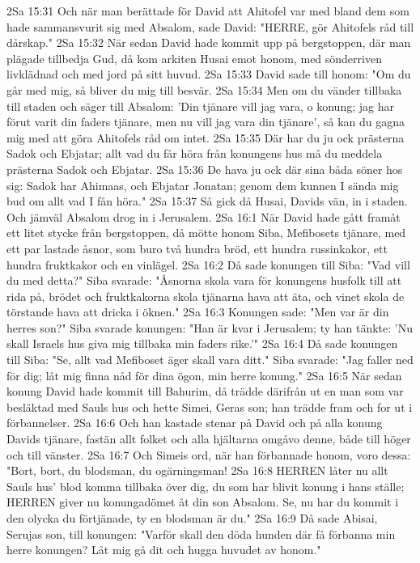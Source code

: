 2Sa 15:31  Och när man berättade för David att Ahitofel var med bland dem som hade sammansvurit sig med Absalom, sade David: "HERRE, gör Ahitofels råd till dårskap."
2Sa 15:32  När sedan David hade kommit upp på bergstoppen, där man plägade tillbedja Gud, då kom arkiten Husai emot honom, med sönderriven livklädnad och med jord på sitt huvud.
2Sa 15:33  David sade till honom: "Om du går med mig, så bliver du mig till besvär.
2Sa 15:34  Men om du vänder tillbaka till staden och säger till Absalom: 'Din tjänare vill jag vara, o konung; jag har förut varit din faders tjänare, men nu vill jag vara din tjänare', så kan du gagna mig med att göra Ahitofels råd om intet.
2Sa 15:35  Där har du ju ock prästerna Sadok och Ebjatar; allt vad du får höra från konungens hus må du meddela prästerna Sadok och Ebjatar.
2Sa 15:36  De hava ju ock där sina båda söner hos sig: Sadok har Ahimaas, och Ebjatar Jonatan; genom dem kunnen I sända mig bud om allt vad I fån höra."
2Sa 15:37  Så gick då Husai, Davids vän, in i staden. Och jämväl Absalom drog in i Jerusalem.
2Sa 16:1  När David hade gått framåt ett litet stycke från bergstoppen, då mötte honom Siba, Mefibosets tjänare, med ett par lastade åsnor, som buro två hundra bröd, ett hundra russinkakor, ett hundra fruktkakor och en vinlägel.
2Sa 16:2  Då sade konungen till Siba: "Vad vill du med detta?" Siba svarade: "Åsnorna skola vara för konungens husfolk till att rida på, brödet och fruktkakorna skola tjänarna hava att äta, och vinet skola de törstande hava att dricka i öknen."
2Sa 16:3  Konungen sade: "Men var är din herres son?" Siba svarade konungen: "Han är kvar i Jerusalem; ty han tänkte: 'Nu skall Israels hus giva mig tillbaka min faders rike.'"
2Sa 16:4  Då sade konungen till Siba: "Se, allt vad Mefiboset äger skall vara ditt." Siba svarade: "Jag faller ned för dig; låt mig finna nåd för dina ögon, min herre konung."
2Sa 16:5  När sedan konung David hade kommit till Bahurim, då trädde därifrån ut en man som var besläktad med Sauls hus och hette Simei, Geras son; han trädde fram och for ut i förbannelser.
2Sa 16:6  Och han kastade stenar på David och på alla konung Davids tjänare, fastän allt folket och alla hjältarna omgåvo denne, både till höger och till vänster.
2Sa 16:7  Och Simeis ord, när han förbannade honom, voro dessa: "Bort, bort, du blodsman, du ogärningsman!
2Sa 16:8  HERREN låter nu allt Sauls hus' blod komma tillbaka över dig, du som har blivit konung i hans ställe; HERREN giver nu konungadömet åt din son Absalom. Se, nu har du kommit i den olycka du förtjänade, ty en blodsman är du."
2Sa 16:9  Då sade Abisai, Serujas son, till konungen: "Varför skall den döda hunden där få förbanna min herre konungen? Låt mig gå dit och hugga huvudet av honom."

